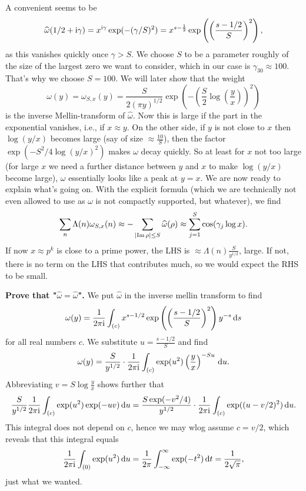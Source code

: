 \documentclass[a4paper,11pt]{article}
\begin{document}
A convenient seems to be 
\[
    \widehat \omega(1/2 + \mathrm i \gamma) = x^{\mathrm i \gamma} \exp(-(\gamma/S)^2) = 
    x^{s-\frac 12} \exp\left( \left(\frac{s-1/2}{S}\right)^2\right),
\]
as this vanishes quickly once $\gamma > S$. We choose $S$ to be a parameter roughly
of the size of the largest zero we want to consider, which in our case is 
$\gamma_{30} \approx 100$. That's why we choose $S = 100$. We will later show
that the weight 
\[
    \omega(y) = \omega_{S,x}(y) = \frac {S}{2(\pi y)^{1/2}} \exp \left(
        -\left( \frac S2 \log\left(\frac yx\right) \right)^2
    \right)
\]
is the inverse Mellin-transform of $\hat \omega$. Now this is large if 
the part in the exponential vanishes, i.e., if $x \approx y$. On the other side,
if $y$ is not close to $x$ then $\log(y/x)$ becomes large (say of size
$\approx \frac{10}S$), then the factor $\exp(-S^2/4 \log(y/x)^2)$ makes
$\omega$ decay quickly. So at least for $x$ not too large (for large $x$ we need
a further distance between $y$ and $x$ to make $\log(y/x)$ become large), $\omega$
essentially looks like a peak at $y=x$. 
We are now ready to explain what's going on. With the explicit formula
(which we are technically not even allowed to use as $\omega$ is not compactly
supported, but whatever), we find
\[
    \sum_n \Lambda(n) \omega_{S,x}(n) \approx - \sum_{\left\lvert \operatorname{Im} \rho \right\rvert \leq S} \widehat
    \omega(\rho) \approx \sum_{j=1}^S \cos(\gamma_j \log x).
\]
If now $x \approx p^k$ is close to a prime power, the LHS is $\approx \Lambda(n)
\frac{S}{y^{1/2}}$, large. If not, there is no term on the LHS that
contributes much, so we would expect the RHS to be small. 

\textbf{Prove that "$\hat \omega = \hat \omega$".} We put $\hat \omega$ in the
inverse mellin transform to find
\[
    \omega(y) = \frac{1}{2 \pi \mathrm i} \int_{(c)} x^{s-1/2} \exp\left( \left(
    \frac{s-1/2}{S}\right)^2 \right) y^{-s} \mathrm{\,d} s
\]
for all real numbers $c$. We substitute $u = \frac{s-1/2}S$ and find
\[
    \omega(y) = \frac S{y^{1/2}} \cdot \frac{1}{2 \pi \mathrm i} \int_{(c)}
    \exp(u^2) \left( \frac yx \right)^{-Su} \mathrm{\,d} u.
\]
Abbreviating $v = S \log \frac yx$ shows further that 
\[
    \frac S{y^{1/2}} \frac{1}{2 \pi \mathrm i} \int_{(c)} \exp(u^2) \exp(-uv) \mathrm{\,d} u 
    = \frac{S \exp(-v^2/4)}{y^{1/2}} \cdot \frac{1}{2 \pi \mathrm i} \int_{(c)}
    \exp((u-v/2)^2) \mathrm{\,d} u.
\]
This integral does not depend on $c$, hence we may wlog assume $c=v/2$, which reveals
that this integral equals
\[
    \frac{1}{2 \pi \mathrm i} \int_{(0)} \exp(u^2) \mathrm{\,d} u = \frac 1{2\pi} \int_{-\infty}^{\infty}
    \exp(-t^2) \mathrm{\,d} t = \frac 1{2 \sqrt \pi},
\]
just what we wanted.
\end{document}
